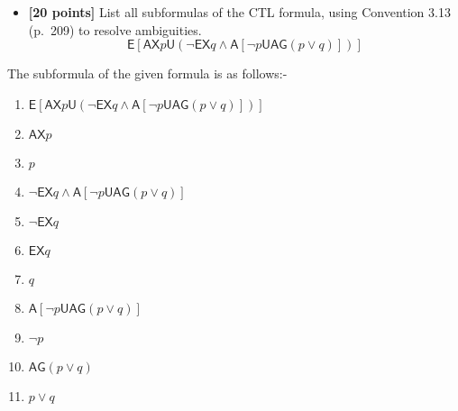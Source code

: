 \documentclass{article}
\def\Forever{\mathord{\mathsf{G}}}
\def\NextX{\mathord{\mathsf{X}}}
\def\Until{\mathrel{\mathsf{U}}}
\def\All{\mathord{\mathsf{A}}}
\def\Exists{\mathord{\mathsf{E}}}
\begin{document}
\begin{itemize}

\item \textbf{[20 points]} List all subformulas of the CTL formula,
  using Convention 3.13 (p.\ 209) to resolve ambiguities.
  \begin{displaymath}
    \Exists [\All \NextX p \Until (\neg \Exists \NextX q \land \All
    [\neg p \Until \All \Forever (p \lor q)])]
  \end{displaymath}
\end{itemize}
	\begin{answer}
	The subformula of the given formula is as follows:-
		\begin{enumerate}
		  \item $\Exists [\All \NextX p \Until (\neg \Exists \NextX q \land \All [\neg
		  p \Until \All \Forever (p \lor q)])]$
		  \item $\All \NextX p$
		  \item $p$
		  \item $\neg \Exists \NextX q \land \All [\neg p \Until \All \Forever (p \lor
		  q)]$
		  \item $\neg \Exists \NextX q$
		  \item $\Exists \NextX q$
		  \item $q$
		  \item $\All [\neg p \Until \All \Forever (p \lor q)]$
		  \item $\neg p$
		  \item $\All \Forever (p \lor q)$
		  \item $p \lor q$
		\end{enumerate}
	\end{answer}
\end{document}
